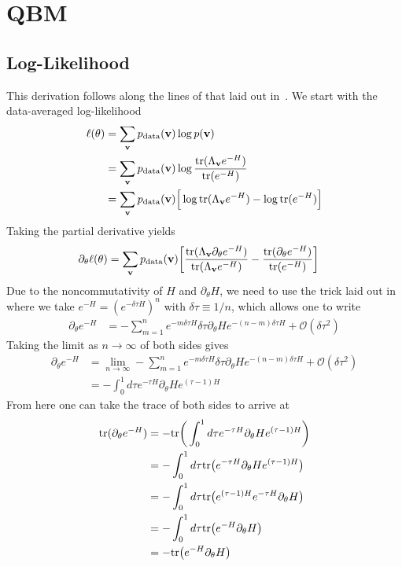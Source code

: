 \section{QBM}
\subsection{Log-Likelihood}\label{app:qbm_log_likelihood_derivation}
This derivation follows along the lines of that laid out in~\cite{amin_2018}.
We start with the data-averaged log-likelihood
\begin{align}
    \ell(\theta)
        &= \sum_{\mathbf{v}} p_{\text{data}}(\mathbf{v}) \log p(\mathbf{v}) \\
        &= \sum_{\mathbf{v}} p_{\text{data}}(\mathbf{v}) \log \frac{\text{tr}(\Lambda_{\mathbf{v}} e^{-H})}{\text{tr}(e^{-H})} \\
        &= \sum_{\mathbf{v}} p_{\text{data}}(\mathbf{v}) \Big[ \log\text{tr}(\Lambda_{\mathbf{v}} e^{-H}) - \log\text{tr}(e^{-H}) \Big]
\end{align}
Taking the partial derivative yields
\begin{align}
    \label{eq:qbm_log_likelihood_derivative}
    \partial_\theta \ell(\theta)
        &= \sum_{\mathbf{v}} p_{\text{data}}(\mathbf{v}) \bigg[ \frac{\text{tr}(\Lambda_{\mathbf{v}} \partial_\theta e^{-H})}{\text{tr}(\Lambda_{\mathbf{v}} e^{-H})} - \frac{\text{tr}(\partial_\theta e^{-H})}{\text{tr}(e^{-H})} \bigg]
\end{align}
Due to the noncommutativity of \( H \) and \( \partial_\theta H \), we need to use the trick laid out in~\cite{amin_2018} where we take \( e^{-H} = (e^{-\delta\tau H})^n \) with \( \delta\tau \equiv 1 / n \), which allows one to write
\begin{align}
    \partial_\theta e^{-H}
        &= -\sum_{m=1}^{n} e^{-m\delta\tau H} \delta\tau \partial_\theta He^{-(n-m)\delta\tau H} + \mathcal{O}(\delta\tau^2)
\end{align}
Taking the limit as \( n \rightarrow \infty \) of both sides gives
\begin{align}
    \partial_\theta e^{-H}
        &= \lim_{n\rightarrow\infty} -\sum_{m=1}^{n} e^{-m\delta\tau H} \delta\tau \partial_\theta He^{-(n-m)\delta\tau H} + \mathcal{O}(\delta\tau^2) \\
        &= -\int_{0}^{1} d\tau e^{-\tau H} \partial_\theta H e^{(\tau-1)H}
\end{align}
From here one can take the trace of both sides to arrive at
\begin{align}
    \text{tr}(\partial_\theta e^{-H})
        &= -\text{tr}\bigg( \int_{0}^{1} d\tau e^{-\tau H} \partial_\theta H e^{(\tau-1)H} \bigg) \\
        &= -\int_{0}^{1} d\tau \text{tr}\big(e^{-\tau H} \partial_\theta H e^{(\tau-1)H} \big) \\
        &= -\int_{0}^{1} d\tau \text{tr}\big(e^{(\tau-1)H} e^{-\tau H} \partial_\theta H \big) \\
        &= -\int_{0}^{1} d\tau \text{tr}\big(e^{-H} \partial_\theta H \big) \\
        &= -\text{tr}\big(e^{-H} \partial_\theta H \big)
\end{align}
